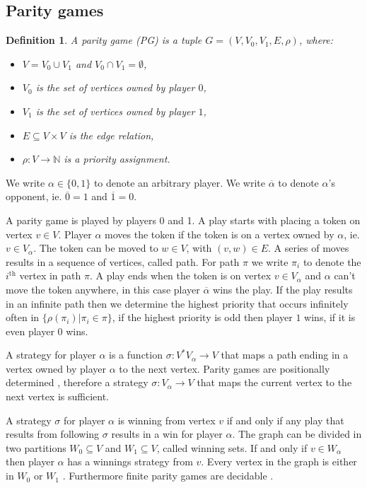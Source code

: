 \documentclass[]{article}
\newtheorem{definition}{Definition}[section]
\begin{document}
\subsection{Parity games}
\begin{definition}
	\label{def_PG}\cite{Bradfield2018}
	A parity game (PG) is a tuple $G = (V, V_0, V_1, E, \rho)$, where:
	\begin{itemize}
		\item $V = V_0 \cup V_1$ and $V_0 \cap V_1 = \emptyset$,
		\item $V_0$ is the set of vertices owned by player $0$,
		\item $V_1$ is the set of vertices owned by player $1$, 
		\item $E \subseteq V \times V$ is the edge relation,
		\item $\rho :  V \rightarrow \mathbb{N}$ is a priority assignment.
	\end{itemize}
\end{definition}
We write $\alpha \in \{0,1\}$ to denote an arbitrary player. We write $\overline{\alpha}$ to denote $\alpha$'s opponent, ie. $\overline{0} = 1$ and $\overline{1} = 0$.

A parity game is played by players 0 and 1. A play starts with placing a token on vertex $v \in V$. Player $\alpha$ moves the token if the token is on a vertex owned by $\alpha$, ie. $v \in V_\alpha$. The token can be moved to $w \in V$, with $(v,w) \in E$. A series of moves results in a sequence of vertices, called path. For path $\pi$ we write $\pi_i$ to denote the $i^{\text{th}}$ vertex in path $\pi$. A play ends when the token is on vertex $v \in V_\alpha$ and $\alpha$ can't move the token anywhere, in this case player $\overline{\alpha}$ wins the play. If the play results in an infinite path then we determine the highest priority that occurs infinitely often in $\{ \rho(\pi_i) | \pi_i \in \pi\}$, if the highest priority is odd then player $1$ wins, if it is even player $0$ wins.

A strategy for player $\alpha$ is a function $\sigma : V^*V_\alpha \rightarrow V$ that maps a path ending in a vertex owned by player $\alpha$ to the next vertex. Parity games are positionally determined \cite{Bradfield2018}, therefore a strategy $\sigma: V_\alpha \rightarrow V$ that maps the current vertex to the next vertex is sufficient. 

A strategy $\sigma$ for player $\alpha$ is winning from vertex $v$ if and only if any play that results from following $\sigma$ results in a win for player $\alpha$. The graph can be divided in two partitions $W_0 \subseteq V$ and $W_1 \subseteq V$, called winning sets. If and only if $v \in W_\alpha$ then player $\alpha$ has a winnings strategy from $v$. Every vertex in the graph is either in $W_0$ or $W_1$ \cite{Bradfield2018}. Furthermore finite parity games are decidable \cite{Bradfield2018}.
\end{document}
